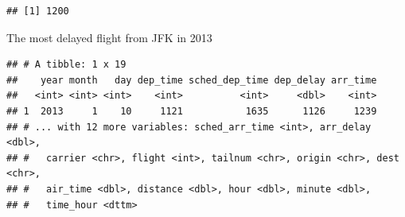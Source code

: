 \documentclass[]{article}
\newenvironment{Shaded}{\begin{snugshade}}{\end{snugshade}}
\newcommand{\KeywordTok}[1]{\textcolor[rgb]{0.13,0.29,0.53}{\textbf{#1}}}
\newcommand{\DataTypeTok}[1]{\textcolor[rgb]{0.13,0.29,0.53}{#1}}
\newcommand{\DecValTok}[1]{\textcolor[rgb]{0.00,0.00,0.81}{#1}}
\newcommand{\StringTok}[1]{\textcolor[rgb]{0.31,0.60,0.02}{#1}}
\newcommand{\OperatorTok}[1]{\textcolor[rgb]{0.81,0.36,0.00}{\textbf{#1}}}
\newcommand{\NormalTok}[1]{#1}
\begin{document}
\begin{Shaded}
\end{Shaded}

\begin{verbatim}
## [1] 1200
\end{verbatim}

The most delayed flight from JFK in 2013

\begin{Shaded}
\end{Shaded}

\begin{verbatim}
## # A tibble: 1 x 19
##    year month   day dep_time sched_dep_time dep_delay arr_time
##   <int> <int> <int>    <int>          <int>     <dbl>    <int>
## 1  2013     1    10     1121           1635      1126     1239
## # ... with 12 more variables: sched_arr_time <int>, arr_delay <dbl>,
## #   carrier <chr>, flight <int>, tailnum <chr>, origin <chr>, dest <chr>,
## #   air_time <dbl>, distance <dbl>, hour <dbl>, minute <dbl>,
## #   time_hour <dttm>
\end{verbatim}

\begin{Shaded}
\end{Shaded}
\end{document}
